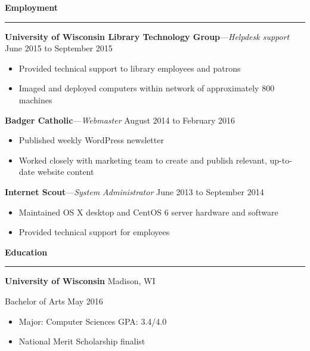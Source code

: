 \documentclass[12pt,letterpaper]{article}
\newenvironment{details}{
    \vspace{-.8em}
    \begin{itemize}
        \renewcommand \labelitemi{\labelitemiv}
        \setlength{\itemsep}{0pt}
        \setlength{\parskip}{-1pt}
        \setlength{\parsep}{0pt}
    }{
    \end{itemize}
    \vspace{-.5em}
}
\newcommand{\hr} {
    \vspace{-1em}
    \par\rule{\textwidth}{1pt}
    \vspace{-1.5em}
}
\newcommand{\ressection}[1] {
    \par{\large \textbf{#1}}
    \hr
}
\newenvironment{employment} {
    \setlength{\parskip}{0pt}
    \ressection{Employment}
}{
    \vspace{0.5em}
}
\newenvironment{education} {
    \ressection{Education}
}{
    \vspace{0.5em}
}
\newcommand{\employer}[3] {
    \vspace{3pt}
    {\par\textbf{#1}---\textit{#2} \hfill #3}
    \vspace{3pt}
    \par
}
\newcommand{\educator}[4] {
    \textbf{#1}
    \hfill #2
    \par #3 \hfill #4
    \par%
    \vspace{3pt}
}
\begin{document}
\begin{employment}
\employer{University of Wisconsin Library Technology Group}{Helpdesk support}{June 2015 to September 2015}
\begin{details}
    \item Provided technical support to library employees and patrons
    \item Imaged and deployed computers within network of approximately 800 machines
\end{details}

\employer{Badger Catholic}{Webmaster}{August 2014 to February 2016}
\begin{details}
    \item Published weekly WordPress newsletter
    \item Worked closely with marketing team to create and publish relevant, up-to-date website content
\end{details}

\employer{Internet Scout}{System Administrator}{June 2013 to September 2014}
\begin{details}
    \item Maintained OS X desktop and CentOS 6 server hardware and software
    \item Provided technical support for employees
\end{details}

\end{employment}

\begin{education}

\educator{University of Wisconsin}{Madison, WI}{Bachelor of Arts}{May 2016}
\begin{details}
    \item Major: Computer Sciences \hfill GPA: 3.4/4.0
    \item National Merit Scholarship finalist
\end{details}

\end{education}
\end{document}
